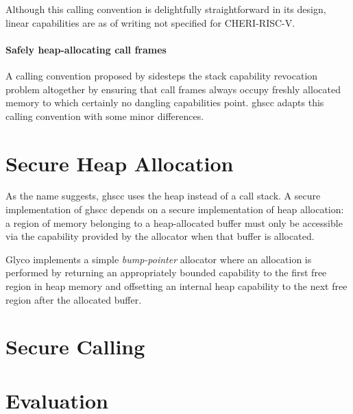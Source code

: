 \documentclass[main.tex]{subfiles}
\begin{document}
Although this calling convention is delightfully straightforward in its design, linear capabilities are as of writing not specified for CHERI-RISC-V.

\paragraph{Safely heap-allocating call frames} A calling convention proposed by \cite{cerise} sidesteps the stack capability revocation problem altogether by ensuring that call frames always occupy freshly allocated memory to which certainly no dangling capabilities point. \gls{ghscc} adapts this calling convention with some minor differences.

\section{Secure Heap Allocation}
As the name suggests, \acrlong{ghscc} uses the heap instead of a call stack. A secure implementation of \gls{ghscc} depends on a secure implementation of heap allocation: a region of memory belonging to a heap-allocated buffer must only be accessible via the capability provided by the allocator when that buffer is allocated.

Glyco implements a simple \emph{bump-pointer} allocator where an allocation is performed by returning an appropriately bounded capability to the first free region in heap memory and offsetting an internal heap capability to the next free region after the allocated buffer.


\section{Secure Calling}

\section{Evaluation}

\biblio{}
\onlyinsubfile{\glsaddall\printglossaries}
\end{document}
